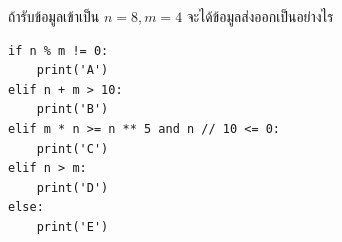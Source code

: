 \question ถ้ารับข้อมูลเข้าเป็น $n=8, m=4$ จะได้ข้อมูลส่งออกเป็นอย่างไร
\begin{verbatim}
if n % m != 0:
    print('A')
elif n + m > 10:
    print('B')
elif m * n >= n ** 5 and n // 10 <= 0:
    print('C')
elif n > m:
    print('D')
else:
    print('E')
\end{verbatim}
